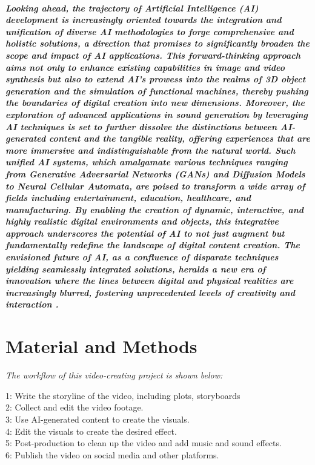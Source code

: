 \documentclass[11pt,a4paper,oneside]{report}
\newcommand{\instructions}[1]{{\color{black}\itshape #1}}
\begin{document}
\paragraph{Looking ahead, the trajectory of Artificial Intelligence (AI) development is increasingly oriented towards the integration and unification of diverse AI methodologies to forge comprehensive and holistic solutions, a direction that promises to significantly broaden the scope and impact of AI applications. This forward-thinking approach aims not only to enhance existing capabilities in image and video synthesis but also to extend AI's prowess into the realms of 3D object generation and the simulation of functional machines, thereby pushing the boundaries of digital creation into new dimensions. Moreover, the exploration of advanced applications in sound generation by leveraging AI techniques is set to further dissolve the distinctions between AI-generated content and the tangible reality, offering experiences that are more immersive and indistinguishable from the natural world. Such unified AI systems, which amalgamate various techniques ranging from Generative Adversarial Networks (GANs) and Diffusion Models to Neural Cellular Automata, are poised to transform a wide array of fields including entertainment, education, healthcare, and manufacturing. By enabling the creation of dynamic, interactive, and highly realistic digital environments and objects, this integrative approach underscores the potential of AI to not just augment but fundamentally redefine the landscape of digital content creation. The envisioned future of AI, as a confluence of disparate techniques yielding seamlessly integrated solutions, heralds a new era of innovation where the lines between digital and physical realities are increasingly blurred, fostering unprecedented levels of creativity and interaction \cite{esser2022towards}.}



\chapter{Material and Methods}
\label{material-and-methods}

\instructions{The workflow of this video-creating project is shown below:

1: Write the storyline of the video, including plots, storyboards \\
2: Collect and edit the video footage.\\
3: Use AI-generated content to create the visuals. \\
4: Edit the visuals to create the desired effect. \\
5: Post-production to clean up the video and add music and sound effects. \\
6: Publish the video on social media and other platforms. \\
}
\end{document}
